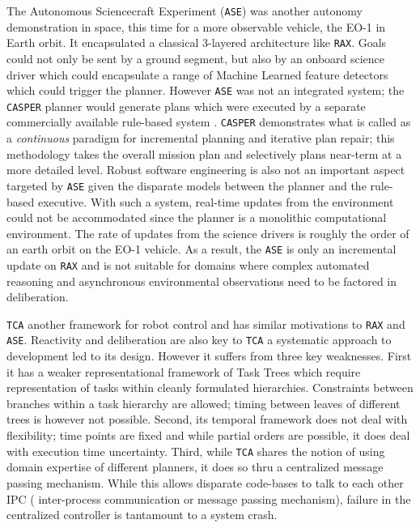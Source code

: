The Autonomous Sciencecraft Experiment (\texttt{ASE}) \cite{chien99,
  chien03} was another autonomy demonstration in space, this time for
a more observable vehicle, the EO-1 in Earth orbit. It encapsulated a
classical 3-layered architecture like \texttt{RAX}. Goals could not
only be sent by a ground segment, but also by an onboard science
driver which could encapsulate a range of Machine Learned feature
detectors which could trigger the planner. However \texttt{ASE} was
not an integrated system; the \texttt{CASPER} planner \cite{chien00}
would generate plans which were executed by a separate commercially
available rule-based system \cite{icl}. \texttt{CASPER} demonstrates
what is called as a \emph{continuous} paradigm for incremental
planning and iterative plan repair; this methodology takes the overall
mission plan and selectively plans  near-term at a
more detailed level.
Robust software engineering is also not an important aspect targeted
by \texttt{ASE} given the disparate models between the planner and the
rule-based executive. With such a system, real-time updates from the
environment could not be accommodated since the planner is a
monolithic computational environment. The rate of updates from the
science drivers is roughly  the order of an earth orbit
on the EO-1 vehicle. As a result, the \texttt{ASE} is only an
incremental update on \texttt{RAX} and is not suitable for domains
where complex automated reasoning and asynchronous environmental
observations need to be factored in deliberation.

\texttt{TCA} \cite{simmons94} another framework for robot control and
has similar motivations to \texttt{RAX} and \texttt{ASE}. Reactivity
and deliberation are also key to \texttt{TCA}  a
systematic approach to development led to its design. However it
suffers from three key weaknesses. First it has a weaker
representational framework of Task Trees which require representation
of tasks within cleanly formulated hierarchies. Constraints between
branches within a task hierarchy are allowed; timing between leaves of
different trees is however not possible. Second, its temporal
framework does not deal with flexibility; time points are fixed and
while partial orders are possible, it does deal with execution time
uncertainty. Third, while \texttt{TCA} shares the notion of using
domain expertise of different planners, it does so thru a centralized
message passing mechanism. While this allows disparate code-bases to
talk to each other  IPC ( inter-process
communication or message passing mechanism), failure in the
centralized controller is tantamount to a system crash.

